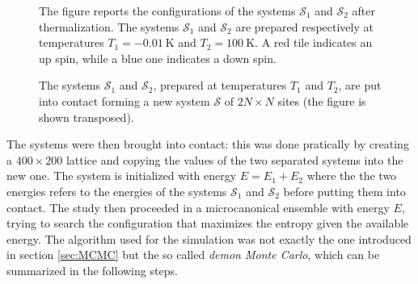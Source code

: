 \begin{figure}[hbtp]
\begin{minipage}[c]{0.45\textwidth}
    \end{minipage}
    \hfill
    \caption{The figure reports the configurations of the systems $\mathcal{S}_1$ and $\mathcal{S}_2$ after thermalization. The systems $\mathcal{S}_1$ and $\mathcal{S}_2$ are prepared respectively at temperatures $T_1 = \SI{-0.01}{\kelvin}$ and $T_2 = \SI{100}{\kelvin}$. A red tile indicates an up spin, while a blue one indicates a down spin.}
    \label{fig:contact_initial}
\end{figure}
\vspace{10pt}
\begin{figure}[htbp]
    \centering
    \caption{The systems $\mathcal{S}_1$ and $\mathcal{S}_2$, prepared at temperatures $T_1$ and $T_2$, are put into contact forming a new system $\mathcal{S}$ of $2N \times N$ sites (the figure is shown transposed).}
    \label{fig:contact_symbolized}
\end{figure}
The systems were then brought into contact: this was done pratically by creating a $400 \times 200$ lattice and copying the values of the two separated systems into the new one. The system is initialized 
with energy $E = E_1 + E_2$ where the the two energies refers to the energies of the systems $\mathcal{S}_1$ and $\mathcal{S}_2$ before putting them into contact. The study then proceeded in a microcanonical ensemble 
with energy $E$, trying to search the configuration that maximizes the entropy given the available energy. The algorithm used for the simulation was not exactly the one introduced in section \ref{sec:MCMC} but the so called \emph{demon Monte Carlo}, which can be summarized in the following steps. \\
